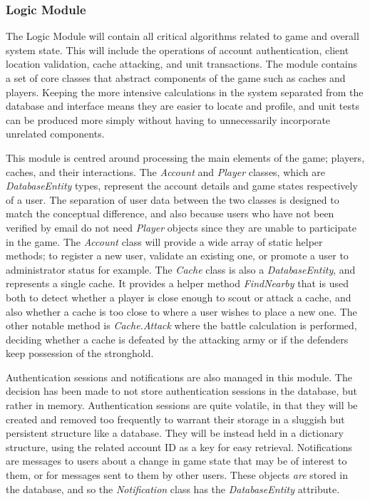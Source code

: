 \subsubsection{Logic Module}
The Logic Module will contain all critical algorithms related to game and overall system state. This will include the operations of account authentication, client location validation, cache attacking, and unit transactions. The module contains a set of core classes that abstract components of the game such as caches and players. Keeping the more intensive calculations in the system separated from the database and interface means they are easier to locate and profile, and unit tests can be produced more simply without having to unnecessarily incorporate unrelated components.

This module is centred around processing the main elements of the game; players, caches, and their interactions. The \emph{Account} and \emph{Player} classes, which are \emph{DatabaseEntity} types, represent the account details and game states respectively of a user. The separation of user data between the two classes is designed to match the conceptual difference, and also because users who have not been verified by email do not need \emph{Player} objects since they are unable to participate in the game. The \emph{Account} class will provide a wide array of static helper methods; to register a new user, validate an existing one, or promote a user to administrator status for example. The \emph{Cache} class is also a \emph{DatabaseEntity}, and represents a single cache. It provides a helper method \emph{FindNearby} that is used both to detect whether a player is close enough to scout or attack a cache, and also whether a cache is too close to where a user wishes to place a new one. The other notable method is \emph{Cache.Attack} where the battle calculation is performed, deciding whether a cache is defeated by the attacking army or if the defenders keep possession of the stronghold.

Authentication sessions and notifications are also managed in this module. The decision has been made to not store authentication sessions in the database, but rather in memory. Authentication sessions are quite volatile, in that they will be created and removed too frequently to warrant their storage in a sluggish but persistent structure like a database. They will be instead held in a dictionary structure, using the related account ID as a key for easy retrieval. Notifications are messages to users about a change in game state that may be of interest to them, or for messages sent to them by other users. These objects \emph{are} stored in the database, and so the \emph{Notification} class has the \emph{DatabaseEntity} attribute.


